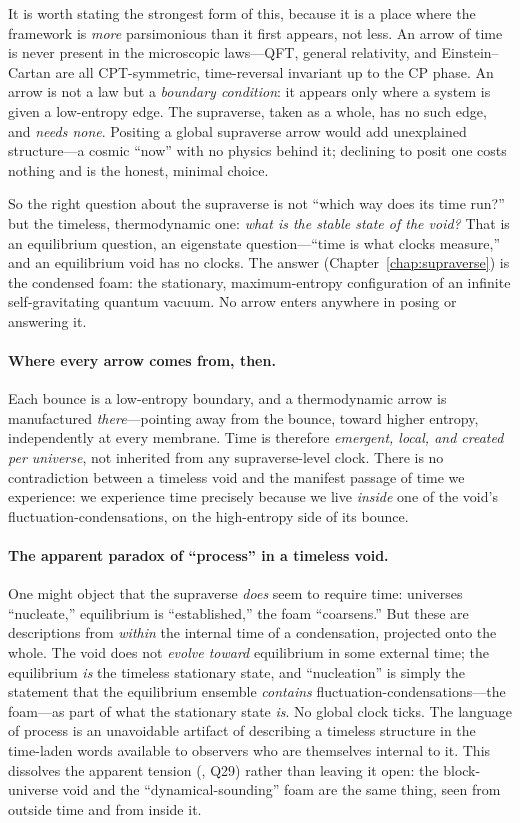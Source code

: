It is worth stating the strongest form of this, because it is a place where the
framework is \emph{more} parsimonious than it first appears, not less. An arrow of
time is never present in the microscopic laws---QFT, general relativity, and
Einstein--Cartan are all CPT-symmetric, time-reversal invariant up to the CP phase.
An arrow is not a law but a \emph{boundary condition}: it appears only where a system
is given a low-entropy edge. The supraverse, taken as a whole, has no such edge, and
\emph{needs none}. Positing a global supraverse arrow would add unexplained
structure---a cosmic ``now'' with no physics behind it; declining to posit one costs
nothing and is the honest, minimal choice.

So the right question about the supraverse is not ``which way does its time run?''
but the timeless, thermodynamic one: \emph{what is the stable state of the void?} That
is an equilibrium question, an eigenstate question---``time is what clocks measure,''
and an equilibrium void has no clocks. The answer (Chapter~\ref{chap:supraverse}) is
the condensed foam: the stationary, maximum-entropy configuration of an infinite
self-gravitating quantum vacuum. No arrow enters anywhere in posing or answering it.

\paragraph{Where every arrow comes from, then.} Each bounce is a low-entropy
boundary, and a thermodynamic arrow is manufactured \emph{there}---pointing away from
the bounce, toward higher entropy, independently at every membrane. Time is therefore
\emph{emergent, local, and created per universe}, not inherited from any
supraverse-level clock. There is no contradiction between a timeless void and the
manifest passage of time we experience: we experience time precisely because we live
\emph{inside} one of the void's fluctuation-condensations, on the high-entropy side of
its bounce.

\paragraph{The apparent paradox of ``process'' in a timeless void.} One might object
that the supraverse \emph{does} seem to require time: universes ``nucleate,''
equilibrium is ``established,'' the foam ``coarsens.'' But these are descriptions from
\emph{within} the internal time of a condensation, projected onto the whole. The void
does not \emph{evolve toward} equilibrium in some external time; the equilibrium
\emph{is} the timeless stationary state, and ``nucleation'' is simply the statement
that the equilibrium ensemble \emph{contains} fluctuation-condensations---the foam---as
part of what the stationary state \emph{is}. No global clock ticks. The language of
process is an unavoidable artifact of describing a timeless structure in the
time-laden words available to observers who are themselves internal to it. This
dissolves the apparent tension (, Q29) rather than leaving it open: the
block-universe void and the ``dynamical-sounding'' foam are the same thing, seen from
outside time and from inside it.

